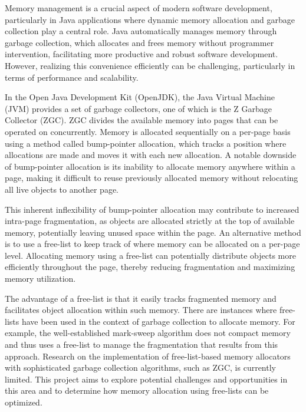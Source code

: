 
Memory management is a crucial aspect of modern software development, particularly in Java applications where dynamic memory allocation and garbage collection play a central role. Java automatically manages memory through garbage collection, which allocates and frees memory without programmer intervention, facilitating more productive and robust software development. However, realizing this convenience efficiently can be challenging, particularly in terms of performance and scalability.

In the Open Java Development Kit (OpenJDK), the Java Virtual Machine (JVM) provides a set of garbage collectors, one of which is the Z Garbage Collector (ZGC). ZGC divides the available memory into pages that can be operated on concurrently. Memory is allocated sequentially on a per-page basis using a method called bump-pointer allocation, which tracks a position where allocations are made and moves it with each new allocation. A notable downside of bump-pointer allocation is its inability to allocate memory anywhere within a page, making it difficult to reuse previously allocated memory without relocating all live objects to another page.

This inherent inflexibility of bump-pointer allocation may contribute to increased intra-page fragmentation, as objects are allocated strictly at the top of available memory, potentially leaving unused space within the page. An alternative method is to use a free-list to keep track of where memory can be allocated on a per-page level. Allocating memory using a free-list can potentially distribute objects more efficiently throughout the page, thereby reducing fragmentation and maximizing memory utilization.

The advantage of a free-list is that it easily tracks fragmented memory and facilitates object allocation within such memory. There are instances where free-lists have been used in the context of garbage collection to allocate memory. For example, the well-established mark-sweep algorithm does not compact memory and thus uses a free-list to manage the fragmentation that results from this approach. Research on the implementation of free-list-based memory allocators with sophisticated garbage collection algorithms, such as ZGC, is currently limited. This project aims to explore potential challenges and opportunities in this area and to determine how memory allocation using free-lists can be optimized.

